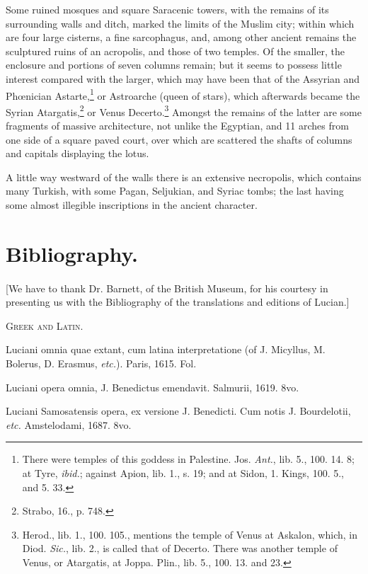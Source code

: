 \documentclass[a4paper, 11pt, oneside, polutonikogreek, english]{article}
\begin{document}
Some ruined mosques and square Saracenic towers, with the remains of its surrounding walls and ditch, marked the limits of the Muslim city; within which are four large cisterns, a fine sarcophagus, and, among other ancient remains the sculptured ruins of an acropolis, and those of two temples. Of the smaller, the enclosure and portions of seven columns remain; but it seems to possess little interest compared with the larger, which may have been that of the Assyrian and Phœnician Astarte,\footnote{There were temples of this goddess in Palestine. Jos. \emph{Ant.}, lib. 5., 100. 14. 8; at Tyre, \emph{ibid.}; against Apion, lib. 1., s. 19; and at Sidon, 1. Kings, 100. 5., and 5. 33.} or Astroarche (queen of stars), which afterwards became the Syrian Atargatis,\footnote{Strabo, 16., p. 748.} or Venus Decerto.\footnote{Herod., lib. 1., 100. 105., mentions the temple of Venus at Askalon, which, in Diod. \emph{Sic.}, lib. 2., is called that of Decerto. There was another temple of Venus, or Atargatis, at Joppa. Plin., lib. 5., 100. 13. and 23.} Amongst the remains of the latter are some fragments of massive architecture, not unlike the Egyptian, and 11 arches from one side of a square paved court, over which are scattered the shafts of columns and capitals displaying the lotus.

A little way westward of the walls there is an extensive necropolis, which contains many Turkish, with some Pagan, Seljukian, and Syriac tombs; the last having some almost illegible inscriptions in the ancient character.
\clearpage
\section{Bibliography.}
\paragraph{}
[We have to thank Dr. Barnett, of the British Museum, for his courtesy in presenting us with the Bibliography of the translations and editions of Lucian.]

\begin{center}
\textsc{Greek and Latin.}
\end{center}

Luciani omnia quae extant, cum latina interpretatione (of J. Micyllus, M. Bolerus, D. Erasmus, \emph{etc.}). Paris, 1615. Fol.

Luciani opera omnia, J. Benedictus emendavit. Salmurii, 1619. 8vo.

Luciani Samosatensis opera, ex versione J. Benedicti. Cum notis J. Bourdelotii, \emph{etc.} Amstelodami, 1687. 8vo.
\end{document}
